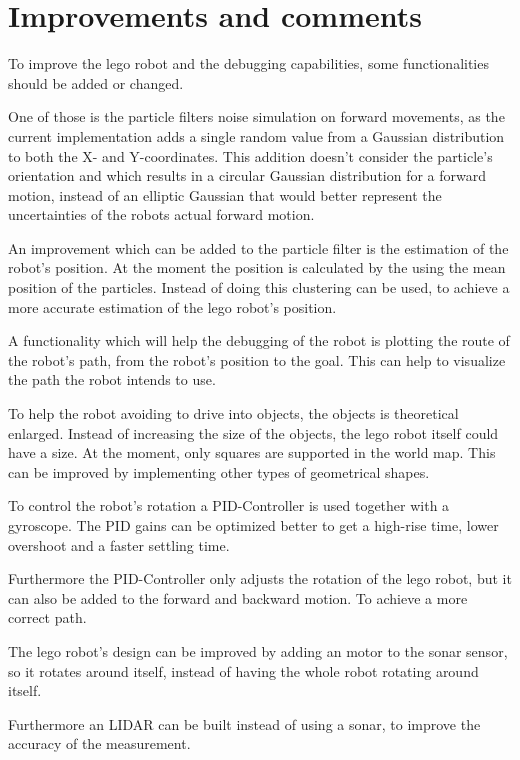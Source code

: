 \section{Improvements and comments}

To improve the lego robot and the debugging capabilities, some functionalities should be added or changed.

One of those is the particle filters noise simulation on forward movements, as the current implementation adds a single random value from a Gaussian distribution to both the X- and Y-coordinates.
This addition doesn't consider the particle's orientation and which results in a circular Gaussian distribution for a forward motion, instead of an elliptic Gaussian that would better represent the uncertainties of the robots actual forward motion.

An improvement which can be added to the particle filter is the estimation of the robot's position. At the moment the position is calculated by the using the mean position of the particles. Instead of doing this clustering can be used, to achieve a more accurate estimation of the lego robot's position.

A functionality which will help the debugging of the robot is plotting the route of the robot’s path, from the robot’s position to the goal. This can help to visualize the path the robot intends to use.

To help the robot avoiding to drive into objects, the objects is theoretical enlarged. Instead of increasing the size of the objects, the lego robot itself could have a size.
At the moment, only squares are supported in the world map. This can be improved by implementing other types of geometrical shapes.

To control the robot’s rotation a PID-Controller is used together with a gyroscope. The PID gains can be optimized better to get a high-rise time, lower overshoot and a faster settling time.

Furthermore the PID-Controller only adjusts the rotation of the lego robot, but it can also be added to the forward and backward motion. To achieve a more correct path.

The lego robot’s design can be improved by adding an motor to the sonar sensor, so it rotates around itself, instead of having the whole robot rotating around itself. 

Furthermore an LIDAR can be built instead of using a sonar, to improve the accuracy of the measurement.
